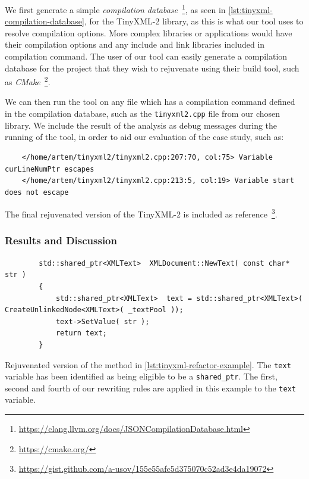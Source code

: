 \documentclass{mpaper}
\begin{document}
    We first generate a simple \emph{compilation database}~\footnote{\url{https://clang.llvm.org/docs/JSONCompilationDatabase.html}}, as seen in \autoref{lst:tinyxml-compilation-database}, for the TinyXML-2 library, as this is what our tool uses to resolve compilation options. 
    More complex libraries or applications would have their compilation options and any include and link libraries included in compilation command.
    The user of our tool can easily generate a compilation database for the project that they wish to rejuvenate using their build tool, such as \emph{CMake}~\footnote{\url{https://cmake.org/}}.
    
    We can then run the tool on any file which has a compilation command defined in the compilation database, such as the \texttt{tinyxml2.cpp} file from our chosen library.   
    We include the result of the analysis as debug messages during the running of the tool, in order to aid our evaluation of the case study, such as:
    \begin{verbatim}
    </home/artem/tinyxml2/tinyxml2.cpp:207:70, col:75> Variable curLineNumPtr escapes
    </home/artem/tinyxml2/tinyxml2.cpp:213:5, col:19> Variable start does not escape
    \end{verbatim}
    
    The final rejuvenated version of the TinyXML-2 is included as reference~\footnote{\url{https://gist.github.com/a-usov/155e55afc5d375070c52ad3e4da19072}}.
    
    \subsubsection{Results and Discussion}
    
    \begin{listing}
        \centering
        \begin{verbatim}
        std::shared_ptr<XMLText>  XMLDocument::NewText( const char* str )
        {
            std::shared_ptr<XMLText>  text = std::shared_ptr<XMLText>( CreateUnlinkedNode<XMLText>( _textPool ));
            text->SetValue( str );
            return text;
        }
        \end{verbatim}
        \caption{Rejuvenated version of the method in \autoref{lst:tinyxml-refactor-example}. The \texttt{text} variable has been identified as being eligible to be a \texttt{shared\_ptr}. The first, second and fourth of our rewriting rules are applied in this example to the \texttt{text} variable.}
        \label{lst:tinyxml-refactor-example-refactored}
    \end{listing}
    
\end{document}
